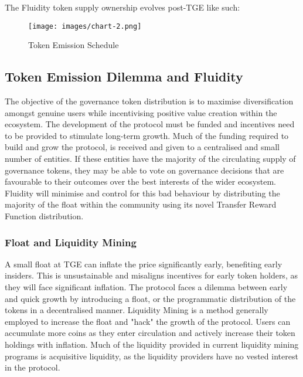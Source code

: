 \vspace{1em}

\newpage

The Fluidity token supply ownership evolves post-TGE like such:

\begin{figure}[h]
    \centering
    \texttt{[image: images/chart-2.png]}
    \caption{Token Emission Schedule}
\end{figure}


\subsection{Token Emission Dilemma and Fluidity}

The objective of the governance token distribution is to maximise diversification amongst genuine users while incentivising positive value creation within the ecosystem. The development of the protocol must be funded and incentives need to be provided to stimulate long-term growth. Much of the funding required to build and grow the protocol, is received and given to a centralised and small number of entities. If these entities have the majority of the circulating supply of governance tokens, they may be able to vote on governance decisions that are favourable to their outcomes over the best interests of the wider ecosystem. Fluidity will minimise and control for this bad behaviour by distributing the majority of the float within the community using its novel Transfer Reward Function distribution.

\subsubsection{Float and Liquidity Mining}
A small float at TGE can inflate the price significantly early, benefiting early insiders. This is unsustainable and misaligns incentives for early token holders, as they will face significant inflation. The protocol faces a dilemma between early and quick growth by introducing a float, or the programmatic distribution of the tokens in a decentralised manner. Liquidity Mining is a method generally employed to increase the float and "hack" the growth of the protocol. Users can accumulate more coins as they enter circulation and actively increase their token holdings with inflation. Much of the liquidity provided in current liquidity mining programs is acquisitive liquidity, as the liquidity providers have no vested interest in the protocol.

